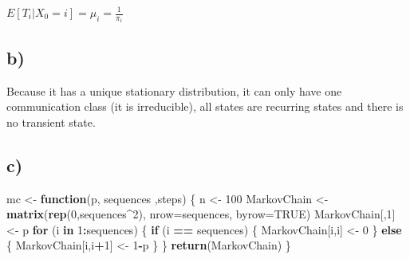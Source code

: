 \documentclass[]{article}
\newenvironment{Shaded}{\begin{snugshade}}{\end{snugshade}}
\newcommand{\ControlFlowTok}[1]{\textcolor[rgb]{0.13,0.29,0.53}{\textbf{#1}}}
\newcommand{\DataTypeTok}[1]{\textcolor[rgb]{0.13,0.29,0.53}{#1}}
\newcommand{\DecValTok}[1]{\textcolor[rgb]{0.00,0.00,0.81}{#1}}
\newcommand{\KeywordTok}[1]{\textcolor[rgb]{0.13,0.29,0.53}{\textbf{#1}}}
\newcommand{\NormalTok}[1]{#1}
\newcommand{\OperatorTok}[1]{\textcolor[rgb]{0.81,0.36,0.00}{\textbf{#1}}}
\newcommand{\OtherTok}[1]{\textcolor[rgb]{0.56,0.35,0.01}{#1}}
\newcommand{\StringTok}[1]{\textcolor[rgb]{0.31,0.60,0.02}{#1}}
\begin{document}
\(E[T_{i}|X_{0} = i] = \mu_{i} = \frac{1}{\pi_{i}}\)

\hypertarget{b-1}{%
\subsection{b)}\label{b-1}}

Because it has a unique stationary distribution, it can only have one
communication class (it is irreducible), all states are recurring states
and there is no transient state.

\hypertarget{c-1}{%
\subsection{c)}\label{c-1}}

\begin{Shaded}
\begin{Highlighting}[]
\NormalTok{mc <-}\StringTok{ }\ControlFlowTok{function}\NormalTok{(p, sequences ,steps) \{}
\NormalTok{    n <-}\StringTok{ }\DecValTok{100}
\NormalTok{    MarkovChain <-}\StringTok{ }\KeywordTok{matrix}\NormalTok{(}\KeywordTok{rep}\NormalTok{(}\DecValTok{0}\NormalTok{,sequences}\OperatorTok{^}\DecValTok{2}\NormalTok{), }\DataTypeTok{nrow=}\NormalTok{sequences, }\DataTypeTok{byrow=}\OtherTok{TRUE}\NormalTok{)}
\NormalTok{    MarkovChain[,}\DecValTok{1}\NormalTok{] <-}\StringTok{ }\NormalTok{p}
    \ControlFlowTok{for}\NormalTok{ (i }\ControlFlowTok{in} \DecValTok{1}\OperatorTok{:}\NormalTok{sequences) \{}
        \ControlFlowTok{if}\NormalTok{ (i }\OperatorTok{==}\StringTok{ }\NormalTok{sequences) \{}
\NormalTok{            MarkovChain[i,i] <-}\StringTok{ }\DecValTok{0}
\NormalTok{        \} }\ControlFlowTok{else}\NormalTok{ \{}
\NormalTok{            MarkovChain[i,i}\OperatorTok{+}\DecValTok{1}\NormalTok{] <-}\StringTok{ }\DecValTok{1}\OperatorTok{-}\NormalTok{p}
\NormalTok{        \}}
\NormalTok{    \}}
    \KeywordTok{return}\NormalTok{(MarkovChain)}
\NormalTok{\}}
\end{Highlighting}
\end{Shaded}
\end{document}
